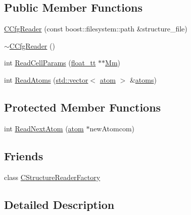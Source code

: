 \subsection*{Public Member Functions}
\begin{DoxyCompactItemize}
\item 
\hyperlink{class_q_s_t_e_m_1_1_c_cfg_reader_a62646755bad76e30077cd65e5b88f1ea}{C\-Cfg\-Reader} (const boost\-::filesystem\-::path \&structure\-\_\-file)
\item 
\hyperlink{class_q_s_t_e_m_1_1_c_cfg_reader_a28e4f5d42dd104758c4fd708f47c383c}{$\sim$\-C\-Cfg\-Reader} ()
\item 
int \hyperlink{class_q_s_t_e_m_1_1_c_cfg_reader_a4acbc1290112e7784d5e5867771b8348}{Read\-Cell\-Params} (\hyperlink{namespace_q_s_t_e_m_a915d7caa497280d9f927c4ce8d330e47}{float\-\_\-tt} $\ast$$\ast$\hyperlink{qmb_8m_af27b785a845d3df0f02f4259f63e97c0}{Mm})
\item 
int \hyperlink{class_q_s_t_e_m_1_1_c_cfg_reader_abe37375764899c2f0bda75740198e9fd}{Read\-Atoms} (\hyperlink{qmb_8m_af54b69a32590de218622e869b06b47b3}{std\-::vector}$<$ \hyperlink{namespace_q_s_t_e_m_a402dabc31a7a1fe906d0cdd138c69686}{atom} $>$ \&\hyperlink{qmb_8m_a7c5cd0264da47e230ba8c984690fe16c}{atoms})
\end{DoxyCompactItemize}
\subsection*{Protected Member Functions}
\begin{DoxyCompactItemize}
\item 
int \hyperlink{class_q_s_t_e_m_1_1_c_cfg_reader_ab3fddeae25408380d09ff5aff044eaa9}{Read\-Next\-Atom} (\hyperlink{namespace_q_s_t_e_m_a402dabc31a7a1fe906d0cdd138c69686}{atom} $\ast$new\-Atomcom)
\end{DoxyCompactItemize}
\subsection*{Friends}
\begin{DoxyCompactItemize}
\item 
class \hyperlink{class_q_s_t_e_m_1_1_c_cfg_reader_a3cb3ed52e085d68c53079740b35a543f}{C\-Structure\-Reader\-Factory}
\end{DoxyCompactItemize}


\subsection{Detailed Description}


